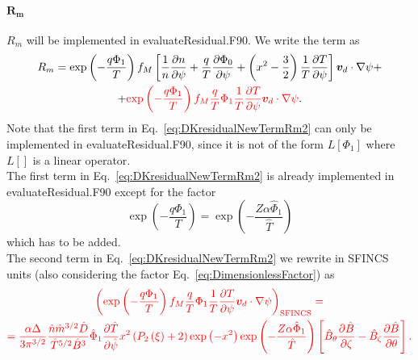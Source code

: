 \documentclass[12pt]{article}
\newcommand{\p}{\partial}
\newcommand{\na}{\nabla}
\begin{document}
\paragraph*{$\bm{R_m}$}
$R_m$ will be implemented in evaluateResidual.F90. We write the term as 
\begin{multline}
R_m = \exp \left(- \frac{q \Phi_1}{T}  \right) f_{M} \left[\frac{1}{n} \frac{\p n}{\p \psi} + \frac{q}{T} \frac{\p \Phi_0}{\p \psi} + \left(x^2 - \frac{3}{2}\right) \frac{1}{T} \frac{\p T}{\p \psi}\right] \bm{v}_d \cdot \na \psi + \\ +  \textcolor{red}{
  \exp \left(- \frac{q \Phi_1}{T}  \right) f_{M} \frac{q}{T} \Phi_1 \frac{1}{T} \frac{\p T}{\p \psi} \bm{v}_d \cdot \na \psi }.
\label{eq:DKresidualNewTermRm2}
\end{multline}
Note that the first term in Eq.~\ref{eq:DKresidualNewTermRm2} can only be implemented in evaluateResidual.F90, since it is not of the form $L\left[\Phi_1\right]$ where $L\left[\right]$ is a linear operator.\\
The first term in Eq.~\ref{eq:DKresidualNewTermRm2} is already implemented in evaluateResidual.F90 except for the factor 
\[
\exp \left(- \frac{q \Phi_1}{T}  \right) = \exp \left(- \frac{Z \alpha \hat{\Phi}_1}{\hat{T}}  \right)
\]
which has to be added.\\
The second term in Eq.~\ref{eq:DKresidualNewTermRm2} we rewrite in SFINCS units (also considering the factor Eq.~\ref{eq:DimensionlessFactor}) as
\begin{multline}
\textcolor{red}{
\left(\exp \left(- \frac{q \Phi_1}{T}  \right) f_{M} \frac{q}{T} \Phi_1 \frac{1}{T} \frac{\p T}{\p \psi} \bm{v}_d \cdot \na \psi\right)_{\mathrm{SFINCS}} = } \\ \textcolor{red}{ =
\frac{\alpha \Delta}{3 \pi^{3/2}} \frac{\hat{n} \hat{m}^{3/2} \hat{D}}{\hat{T}^{5/2} \hat{B}^3 } \hat{\Phi}_1 \frac{\p \hat{T}}{\p \hat{\psi}}
x^2 \left(P_2\left(\xi\right) + 2\right)
\exp\left(-x^2\right) \exp \left(- \frac{Z \alpha \hat{\Phi}_1}{\hat{T}}\right) \left[\hat{B}_{\theta} \frac{\p \hat{B}}{\p \zeta} - \hat{B}_{\zeta} \frac{\p \hat{B}}{\p \theta}\right]. 
}
\label{eq:Rmterm2}
\end{multline}
\end{document}
